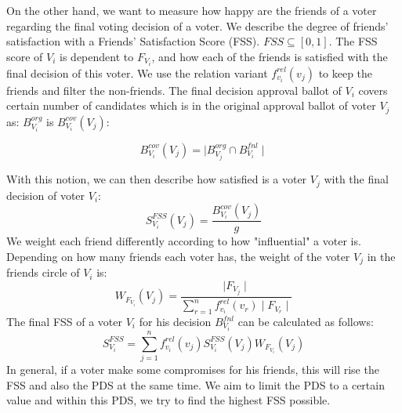 \documentclass[
   a4paper,                      %
   tucfont,                      %
   english,                      %
   tuctitle,                     %
   intoc,                        %
   twoside,                      %
   captions=tableheading,        %
   openright,                    %
   final,                        %
   ]{tuc-thesis}                 %
\begin{document}
On the other hand, we want to measure how happy are the friends of a voter regarding the final voting decision of a voter. We describe the degree of friends' satisfaction with a Friends' Satisfaction Score (FSS). $FSS \subseteq [0,1]$. The FSS score of $V_i$ is dependent to $F_{V_i}$, and how each of the friends is satisfied with the final decision of this voter. We use the relation variant $f_{v_i}^{rel}(v_j)$ to keep the friends and filter the non-friends. The final decision approval ballot of $V_i$ covers certain number of candidates which is in the original approval ballot of voter $V_j$ as: $B_{V_i}^{org}$  is $B_{V_i}^{cov}(V_j)$:

\begin{equation}
    B_{V_i}^{cov}(V_j) = \mid B_{V_j}^{org} \cap B_{V_i}^{fnl} \mid
\end{equation}

With this notion, we can then describe how satisfied is a voter $V_j$ with the final decision of voter $V_i$:
\begin{equation}
S_{V_i}^{FSS}(V_j)=\frac{B_{V_i}^{cov}(V_j)}{g}
\end{equation}
We weight each friend differently according to how "influential" a voter is. Depending on how many friends each voter has, the weight of the voter $V_j$ in the friends circle of $V_i$ is: 
\begin{equation}
W_{F_{V_i}}(V_j)=\frac{\mid F_{V_j}\mid }{\sum_{r=1}^{n}f_{v_i}^{rel}(v_r) \mid F_{V_r} \mid }
\end{equation}
The final FSS of a voter $V_i$ for his decision $B_{V_i}^{fnl}$ can be calculated as follows:
\begin{equation}
S_{V_i}^{FSS}=\sum_{j=1}^{n}f_{v_i}^{rel}(v_j)S_{V_i}^{FSS}(V_j)W_{F_{V_i}}(V_j)
\end{equation}
In general, if a voter make some compromises for his friends, this will rise the FSS and also the PDS at the same time. We aim to limit the PDS to a certain value and within this PDS, we try to find the highest FSS possible.






% 
% 
% 
% 
% 
% 
% 


\backmatter

\printbibliography
\end{document}
